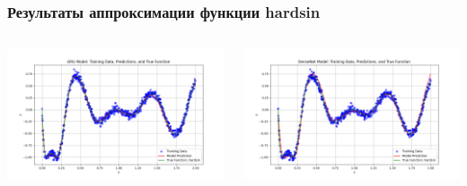 \documentclass
  [ russian
  , aspectratio=1610 %
  ] {beamer}
\begin{document}
\begin{frame}
    \frametitle{Результаты аппроксимации функции hardsin}
    \begin{columns}
        \begin{column}{0.5\textwidth}
            \centering
            \includegraphics[width=1.1\textwidth]{figures/hardsin_500eph_gru_apr_plot.png}
        \end{column}
        \begin{column}{0.5\textwidth}
            \centering
            \includegraphics[width=1.1\textwidth]{figures/hardsin_500eph_dense_apr_plot.png}
        \end{column}
    \end{columns}
\end{frame}
\end{document}
